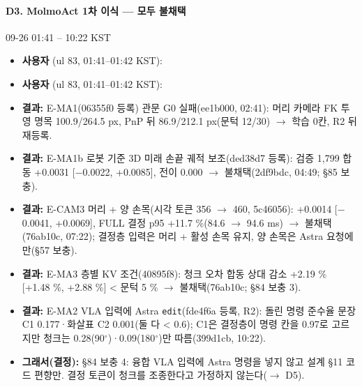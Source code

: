 \paragraph{D3. MolmoAct 1차 이식 --- 모두 불채택}
{\small 09-26 01:41 -- 10:22 KST}
\begin{itemize}
  \item \textbf{사용자} (ul 83, 01:41--01:42 KST): 
  \item \textbf{사용자} (ul 83, 01:41--01:42 KST): 
  \item \textbf{결과:} E-MA1(06355f0 등록) 관문 G0 실패(ee1b000, 02:41): 머리 카메라 FK 투영 명목 100.9/264.5 px, PnP 뒤 86.9/212.1 px(문턱 12/30) $\rightarrow$ 학습 0칸, R2 뒤 재등록.
  \item \textbf{결과:} E-MA1b 로봇 기준 3D 미래 손끝 궤적 보조(ded38d7 등록): 검증 1,799 합동 +0.0031 [$-$0.0022, +0.0085], 전이 0.000 $\rightarrow$ 불채택(2df9bdc, 04:49; §85 보충).
  \item \textbf{결과:} E-CAM3 머리 + 양 손목(시각 토큰 356 $\rightarrow$ 460, 5c46056): +0.0014 [$-$0.0041, +0.0069], FULL 결정 p95 +11.7 \%(84.6 $\rightarrow$ 94.6 ms) $\rightarrow$ 불채택(76ab10c, 07:22); 결정층 입력은 머리 + 활성 손목 유지, 양 손목은 Astra 요청에만(§57 보충).
  \item \textbf{결과:} E-MA3 층별 KV 조건(40895f8): 청크 오차 합동 상대 감소 +2.19 \% [+1.48 \%, +2.88 \%] < 문턱 5 \% $\rightarrow$ 불채택(76ab10c; §84 보충 3).
  \item \textbf{결과:} E-MA2 VLA 입력에 Astra \texttt{edit}(fde4f6a 등록, R2): 돌린 명령 준수율 문장 C1 0.177·화살표 C2 0.001(둘 다 < 0.6); C1은 결정층이 명령 칸을 0.97로 고르지만 청크는 0.28(90$^\circ$)·0.09(180$^\circ$)만 따름(399d1cb, 10:22).
  \item \textbf{그래서(결정):} §84 보충 4: 융합 VLA 입력에 Astra 명령을 넣지 않고 설계 §11 코드 편향만. 결정 토큰이 청크를 조종한다고 가정하지 않는다($\rightarrow$ D5).
\end{itemize}

